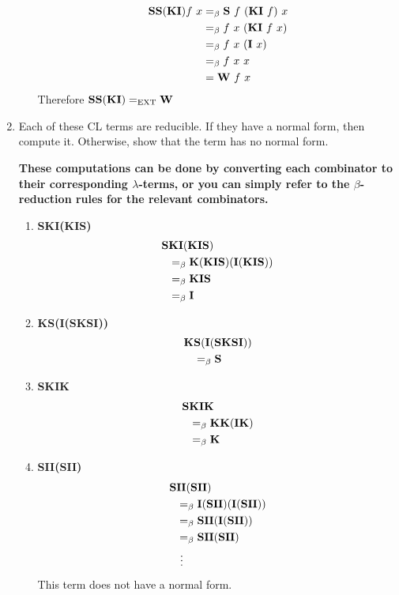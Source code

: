 \documentclass[11pt]{report}
\begin{document}
\begin{enumerate}
\begin{enumerate}
		\begin{align*}
			\textbf{S} \textbf{S}(\textbf{K}\textbf{I})f \ x &=_{\beta} \textbf{S} \ f \ (\textbf{K}\textbf{I} \ f) \ x \\
			&=_{\beta} f \ x \ (\textbf{K}\textbf{I} \ f \ x) \\
			&=_{\beta} f \ x \ (\textbf{I} \ x) \\
			&=_{\beta} f \ x \ x \\
			&= \textbf{W} \ f \ x		
		\end{align*}
		Therefore $\textbf{S} \textbf{S}(\textbf{K}\textbf{I}) =_{\text{EXT}} \textbf{W}$
	\end{enumerate}

\newpage
\item Each of these CL terms are reducible. If they have a normal form, then compute it. Otherwise, show that the term has no normal form.

\textbf{These computations can be done by converting each combinator to their corresponding $\lambda$-terms, or you can simply refer to the $\beta$-reduction rules for the relevant combinators.} 

	\begin{enumerate}
		\item \textbf{SKI(KIS)}
			\begin{align*}
				\textbf{S}&\textbf{K}\textbf{I}(\textbf{K}\textbf{I}\textbf{S}) \\
				&=_{\beta} \textbf{K}(\textbf{K}\textbf{I}\textbf{S})(\textbf{I}(\textbf{K}\textbf{I}\textbf{S})) \\
				&=_{\beta} \textbf{K}\textbf{I}\textbf{S} \\
				&=_{\beta} \textbf{I}
			\end{align*}
		\item \textbf{KS(I(SKSI))}
			\begin{align*}
				\textbf{K}&\textbf{S}(\textbf{I}(\textbf{S}\textbf{K}\textbf{S}\textbf{I})) \\
				&=_{\beta} \textbf{S}
			\end{align*}
		\item \textbf{SKIK}
			\begin{align*}
				\textbf{S}&\textbf{K}\textbf{I}\textbf{K} \\
				&=_{\beta} \textbf{K}\textbf{K}(\textbf{I}\textbf{K}) \\
				&=_{\beta} \textbf{K}			
			\end{align*}
		\item \textbf{SII(SII)}
			\begin{align*}
				\textbf{S}&\textbf{I}\textbf{I}(\textbf{S}\textbf{I}\textbf{I}) \\
				&=_{\beta} \textbf{I}(\textbf{S}\textbf{I}\textbf{I})(\textbf{I}(\textbf{S}\textbf{I}\textbf{I}))\\
				&=_{\beta} \textbf{S}\textbf{I}\textbf{I}(\textbf{I}(\textbf{S}\textbf{I}\textbf{I})) \\
				&=_{\beta} \textbf{S}\textbf{I}\textbf{I}(\textbf{S}\textbf{I}\textbf{I}) \\
				& \ \vdots			
			\end{align*}
			This term does not have a normal form. 
	\end{enumerate}


\end{enumerate}
\end{document}
